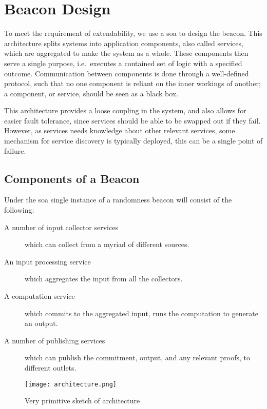 \section{Beacon Design}

To meet the requirement of extendability, we use a \gls{soa} to design the beacon.
This architecture splits systems into application components, also called services, which are aggregated to make the system as a whole.
These components then serve a single purpose, i.e.\ executes a contained set of logic with a specified outcome.
Communication between components is done through a well-defined protocol, such that no one component is reliant on the inner workings of another;
a component, or service, should be seen as a black box.

This architecture provides a loose coupling in the system, and also allows for easier fault tolerance, since services should be able to be swapped out if they fail.
However, as services needs knowledge about other relevant services, some mechanism for service discovery is typically deployed, this can be a single point of failure.

\subsection{Components of a Beacon}
\label{sub:components_of_a_beacon}
Under the \gls{soa} single instance of a randomness beacon will consist of the following:
\begin{description}
    \item[A number of input collector services] which can collect from a myriad of different sources.
    \item[An input processing service] which aggregates the input from all the collectors.
    \item[A computation service] which commits to the aggregated input, runs the computation to generate an output.
    \item[A number of publishing services] which can publish the commitment, output, and any relevant proofs, to different outlets.
\end{description}

\begin{figure}[htpb]
    \centering
    \texttt{[image: architecture.png]}
    \caption{Very primitive sketch of architecture}
\end{figure}

